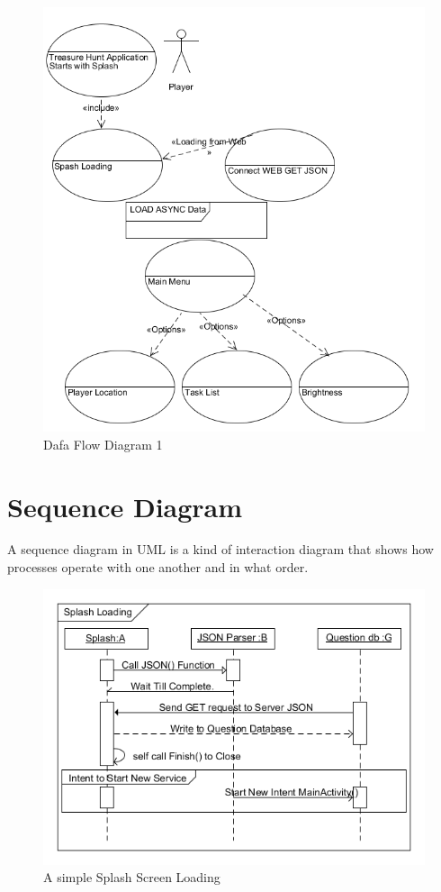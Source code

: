 \begin{figure}[ht!]
\left
\includegraphics[width=150mm]{dfd0}
\caption{Dafa Flow Diagram 1}
\label{overflow}
\end{figure}
\newpage

\section{Sequence Diagram}
A sequence diagram in UML is a kind of interaction diagram that shows how processes operate with one another and in what order. \\

\begin{figure}[ht!]
\left
\includegraphics[width=150mm]{splash}
\caption{A simple Splash Screen Loading}
\label{overflow}
\end{figure}
\newpage


